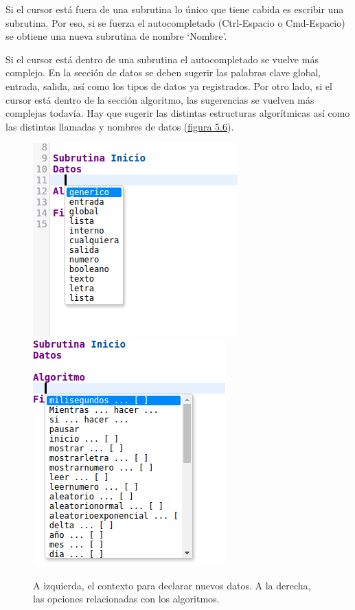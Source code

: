 \documentclass{report}
\begin{document}
	\vspace{10px}
	
	Si el cursor está fuera de una subrutina lo único que tiene cabida es escribir una subrutina. Por eso, si se fuerza el autocompletado (Ctrl-Espacio o Cmd-Espacio) se obtiene una nueva subrutina de nombre `Nombre'.
	
	\vspace{10px}
	
	Si el cursor está dentro de una subrutina el autocompletado se vuelve más complejo. En la sección de datos se deben sugerir las palabras clave global, entrada, salida, así como los tipos de datos ya registrados. Por otro lado, si el cursor está dentro de la sección algoritmo, las sugerencias se vuelven más complejas todavía. Hay que sugerir las distintas estructuras algorítmicas así como las distintas llamadas y nombres de datos (\hyperref[fig:autocompletado]{figura 5.6}).
	
\begin{figure}
\centering
	\includegraphics[width=0.45\linewidth]{autocompletado2}
	\includegraphics[width=0.35\linewidth]{autocompletado3}
\caption[Ejemplos de distintos contextos en autocompletado.]{A izquierda, el contexto para declarar nuevos datos. A la derecha, las opciones relacionadas con los algoritmos.}
\label{fig:autocompletado}
\end{figure}
	
	\vspace{10px}
	
\end{document}
